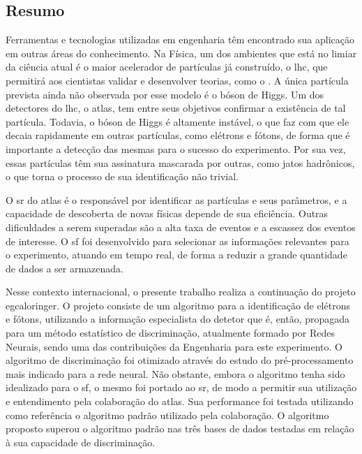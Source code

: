 \vfill
\begin{center}
\section*{Resumo\label{Resumo}}
\end{center}

Ferramentas e tecnologias utilizadas em engenharia têm encontrado sua
aplicação em outras áreas do conhecimento.
Na Física, um dos ambientes que está no limiar da ciência atual é o maior acelerador 
de partículas já construído, o \acrshort{lhc}, que permitirá aos
cientistas validar e desenvolver teorias, como o . A
única partícula prevista ainda não observada por esse modelo é o bóson
de Higgs. Um dos detectores do \acrshort{lhc}, o \acrshort{atlas}, tem entre seus objetivos 
confirmar a existência de tal partícula. Todavia, o bóson de Higgs é altamente
instável, o que faz com que ele decaia rapidamente em outras partículas, como elétrons e fótons, de forma que é importante 
a detecção das mesmas para o sucesso do experimento. Por sua vez, essas
partículas têm sua assinatura mascarada por outras, como jatos hadrônicos, o que
torna o processo de sua identificação não trivial. 

O \gls{sr} do \acrshort{atlas} é o responsável por identificar as
partículas e seus parâmetros, e a capacidade de descoberta de novas físicas 
depende de sua eficiência. Outras dificuldades a serem superadas são a alta taxa de
eventos e a escassez dos eventos de interesse. 
O \gls{sf} foi desenvolvido para selecionar as informações relevantes para o experimento, 
atuando em tempo real, de forma a reduzir a grande quantidade de dados a ser armazenada.

Nesse contexto internacional, o presente trabalho realiza a continuação
do projeto \acrshort{egcaloringer}. O projeto consiste de um algoritmo 
para a identificação de elétrons e fótons, utilizando a informação especialista 
do detetor que é, então, propagada para um método estatístico de discriminação, 
atualmente formado por Redes Neurais, sendo uma das contribuições da
Engenharia para este experimento. O algoritmo de discriminação foi otimizado 
através do estudo do pré-processamento mais indicado para a rede neural. 
Não obstante, embora o algoritmo tenha sido idealizado para o \gls{sf}, 
o mesmo foi portado ao \gls{sr}, de modo a permitir sua utilização e 
entendimento pela colaboração do \acrshort{atlas}. Sua performance foi 
testada utilizando como referência o algoritmo padrão utilizado 
pela colaboração. O algoritmo proposto superou o algoritmo padrão nas três bases
de dados testadas em relação à sua capacidade de discriminação.

